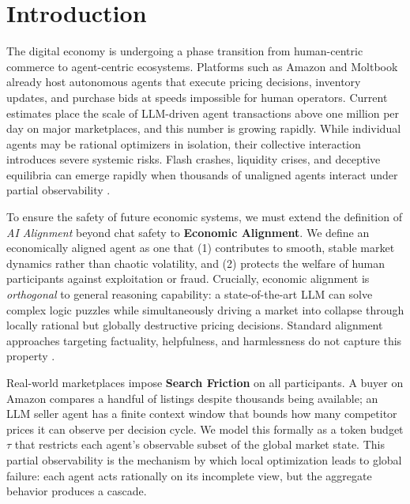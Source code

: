 \section{Introduction}
\label{intro}

The digital economy is undergoing a phase transition from human-centric commerce to agent-centric ecosystems. Platforms such as Amazon and Moltbook already host autonomous agents that execute pricing decisions, inventory updates, and purchase bids at speeds impossible for human operators. Current estimates place the scale of LLM-driven agent transactions above one million per day on major marketplaces, and this number is growing rapidly. While individual agents may be rational optimizers in isolation, their collective interaction introduces severe systemic risks. Flash crashes, liquidity crises, and deceptive equilibria can emerge rapidly when thousands of unaligned agents interact under partial observability \citep{kirilenko2017flash,farmer2009economy}.

To ensure the safety of future economic systems, we must extend the definition of \textit{AI Alignment} beyond chat safety to \textbf{Economic Alignment}. We define an economically aligned agent as one that (1) contributes to smooth, stable market dynamics rather than chaotic volatility, and (2) protects the welfare of human participants against exploitation or fraud. Crucially, economic alignment is \emph{orthogonal} to general reasoning capability: a state-of-the-art LLM can solve complex logic puzzles while simultaneously driving a market into collapse through locally rational but globally destructive pricing decisions. Standard alignment approaches targeting factuality, helpfulness, and harmlessness do not capture this property \citep{ouyang2022training}.

Real-world marketplaces impose \textbf{Search Friction} on all participants. A buyer on Amazon compares a handful of listings despite thousands being available; an LLM seller agent has a finite context window that bounds how many competitor prices it can observe per decision cycle. We model this formally as a token budget $\tau$ that restricts each agent's observable subset of the global market state. This partial observability is the mechanism by which local optimization leads to global failure: each agent acts rationally on its incomplete view, but the aggregate behavior produces a cascade.


